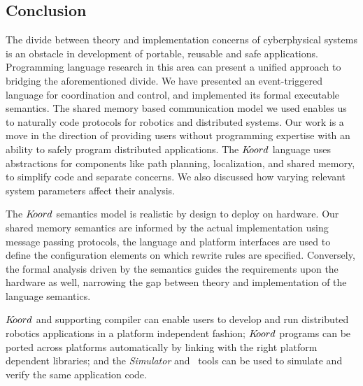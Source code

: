 \subsection{Conclusion}
\label{sec:conclusion}

The divide between theory and implementation concerns of cyberphysical systems is an obstacle in development of portable, reusable and safe applications. Programming language research in this area can present a unified approach to bridging the aforementioned divide. We have presented  an event-triggered language for coordination and control, and implemented its formal executable semantics. The shared memory based communication model we used enables us to naturally code protocols for robotics and distributed systems. Our work is a move in the direction of providing users without programming expertise with an ability to safely program distributed applications.  The $K\kern-2pt oord$ language uses abstractions for components like path planning, localization, and shared memory, to simplify code and separate concerns. We also discussed how varying relevant system parameters affect their analysis.

The $K\kern-2pt oord$ semantics model is realistic by design to deploy on hardware. Our shared memory semantics are informed by the actual implementation using message passing protocols, the language and platform interfaces are used to define the configuration elements on which rewrite rules are specified. Conversely, the formal analysis driven by the semantics guides the requirements upon the hardware as well, narrowing the gap between theory and implementation of the language semantics. 

 $K\kern-2pt oord$ and supporting compiler can  enable users to develop and run distributed robotics applications in a platform independent fashion; $K\kern-2pt oord$ programs can be ported across platforms automatically by linking with the right platform dependent libraries; and the \emph{Simulator} and \kbmc\ tools can be used to simulate and verify the same application code. 

